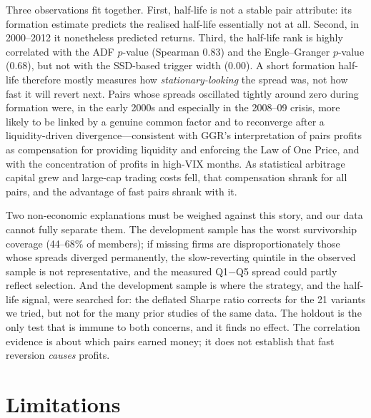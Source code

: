 \documentclass[11pt]{article}
\begin{document}
Three observations fit together. First, half-life is not a stable pair attribute: its formation estimate predicts the realised half-life essentially not at all. Second, in 2000--2012 it nonetheless predicted returns. Third, the half-life rank is highly correlated with the ADF $p$-value (Spearman 0.83) and the Engle--Granger $p$-value (0.68), but not with the SSD-based trigger width (0.00). A short formation half-life therefore mostly measures how \emph{stationary-looking} the spread was, not how fast it will revert next. Pairs whose spreads oscillated tightly around zero during formation were, in the early 2000s and especially in the 2008--09 crisis, more likely to be linked by a genuine common factor and to reconverge after a liquidity-driven divergence---consistent with GGR's interpretation of pairs profits as compensation for providing liquidity and enforcing the Law of One Price, and with the concentration of profits in high-VIX months. As statistical arbitrage capital grew and large-cap trading costs fell, that compensation shrank for all pairs, and the advantage of fast pairs shrank with it.

Two non-economic explanations must be weighed against this story, and our data cannot fully separate them. The development sample has the worst survivorship coverage (44--68\% of members); if missing firms are disproportionately those whose spreads diverged permanently, the slow-reverting quintile in the observed sample is not representative, and the measured Q1$-$Q5 spread could partly reflect selection. And the development sample is where the strategy, and the half-life signal, were searched for: the deflated Sharpe ratio corrects for the 21 variants we tried, but not for the many prior studies of the same data. The holdout is the only test that is immune to both concerns, and it finds no effect. The correlation evidence is about which pairs earned money; it does not establish that fast reversion \emph{causes} profits.

\section{Limitations}
\end{document}
